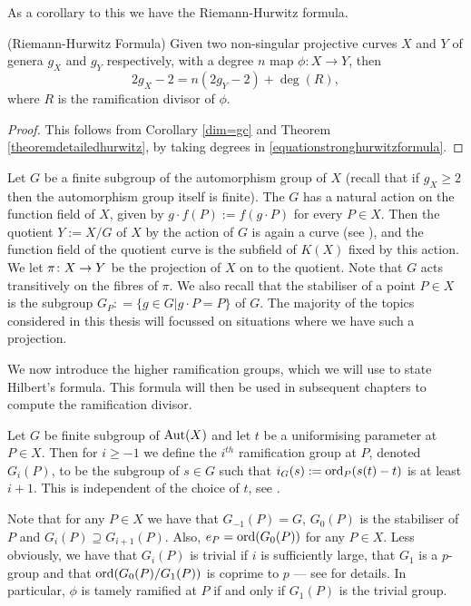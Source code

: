 As a corollary to this we have the Riemann-Hurwitz formula.
    \begin{cor}\label{corhurwitzformula}(Riemann-Hurwitz Formula)
    Given two non-singular projective curves $X$ and $Y$ of genera $g_X$ and $g_Y$ respectively, with a degree $n$ map $\phi\colon X \rightarrow Y$, then
        \[
        2g_X - 2 = n(2g_Y -2) + \deg(R),
        \]
    where $R$ is the ramification divisor of $\phi$.
    \end{cor}
    \begin{proof}
    This follows from Corollary \ref{dim=gc} and Theorem \ref{theoremdetailedhurwitz}, by taking degrees in \eqref{equationstronghurwitzformula}.
    \end{proof}

Let $G$ be a finite subgroup of the automorphism group of $X$ (recall that if $g_X \geq 2$ then the automorphism group itself is finite).
The $G$ has a natural action on the function field of $X$, given by $g\cdot f(P) := f(g \cdot P)$ for every $P \in X$.
Then the quotient $Y := X/G$ of $X$ by the action of $G$ is again a curve (see \cite[Pgs. 126-7]{griffithsfirstcourse}), and the function field of the quotient curve is the subfield of $K(X)$ fixed by this action.
We let $\pi \colon X \rightarrow Y$ be the projection of $X$ on to the quotient.
Note that $G$ acts transitively on the fibres of $\pi$.
We also recall that the stabiliser of a point $P \in X$ is the subgroup $G_P : = \{ g \in G | g \cdot P = P\}$ of $G$.
The majority of the topics considered in this thesis will focussed on situations where we have such a projection.

We now introduce the higher ramification groups, which we will use to state Hilbert's formula. 
This formula will then be used in subsequent chapters to compute the ramification divisor.

   \begin{defn}
    Let $G$ be finite subgroup of $\operatorname{Aut}(X)$ and let $t$ be a uniformising parameter at $P\in X$.
    Then for $i\geq -1$ we define the $i^{th}$ ramification group at $P$, denoted $G_i(P)$, to be the subgroup of $s\in G$ such that $i_G(s) := \operatorname{ord}_P(s(t)-t)$ is at least $i+1$.
    This is	independent of the choice of $t$, see \cite[Chap. IV, \S 1, pg. 62]{localfields}.
    \end{defn}

Note that for any $P\in X$ we have that $G_{-1}(P)=G$, $G_0(P)$ is the stabiliser of $P$ and $G_i(P)\supseteq G_{i+1}(P)$.
Also, $e_P = \operatorname{ord} (G_0(P))$ for any $P \in X$.
Less obviously, we have that $G_i(P)$ is trivial if $i$ is sufficiently large, that $G_1$ is a $p$-group and that $\operatorname{ord}(G_0(P)/G_1(P))$ is coprime to $p$ ---  see \cite[Chap. IV, \S 1]{localfields} for details.
In particular, $\phi$ is tamely ramified at $P$ if and only if $G_1(P)$ is the trivial group.



